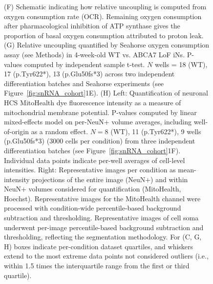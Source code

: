 \begin{figure}[ht]
{        (F) Schematic indicating how relative uncoupling is computed from oxygen consumption rate (OCR). Remaining oxygen consumption after pharmacological inhibition of ATP synthase gives the proportion of basal oxygen consumption attributed to proton leak. 
        (G) Relative uncoupling quantified by Seahorse oxygen consumption assay (see Methods) in 4-week-old WT vs. ABCA7 LoF iNs. P-values computed by independent sample t-test. $N$ wells = 18 (WT), 17 (p.Tyr622*), 13 (p.Glu50fs*3) across two independent differentiation batches and Seahorse experiments (see Figure~\ref{fig:snRNA_cohort}1E). 
        (H) Left: Quantification of neuronal HCS MitoHealth dye fluorescence intensity as a measure of mitochondrial membrane potential. P-values computed by linear mixed-effects model on per-NeuN+ volume averages, including well-of-origin as a random effect. $N=8$ (WT), 11 (p.Tyr622*), 9 wells (p.Glu50fs*3) (3000 cells per condition) from three independent differentiation batches (see Figure~\ref{fig:snRNA_cohort}1F). Individual data points indicate per-well averages of cell-level intensities. Right: Representative images per condition as mean-intensity projections of the entire image (NeuN+) and within NeuN+ volumes considered for quantification (MitoHealth, Hoechst). Representative images for the MitoHealth channel were processed with condition-wide percentile-based background subtraction and thresholding. Representative images of cell soma underwent per-image percentile-based background subtraction and thresholding, reflecting the segmentation methodology. For (C, G, H) boxes indicate per-condition dataset quartiles, and whiskers extend to the most extreme data points not considered outliers (i.e., within 1.5 times the interquartile range from the first or third quartile). 
    }
    \label{fig:main_mitochondrial}
\end{figure}